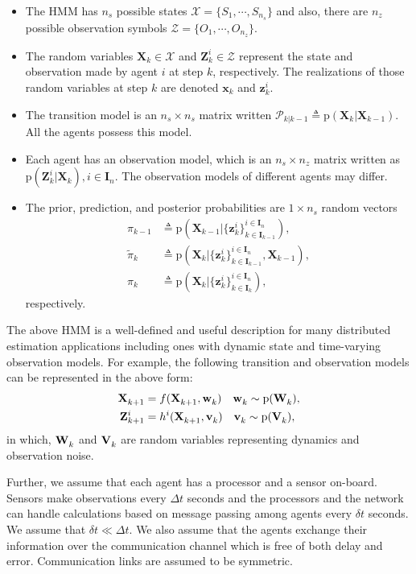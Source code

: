 \documentclass[journal]{IEEEtran}
\newcommand{\vect}[1]{{\mathbf{#1}}}
\theoremstyle{remark}
\newcommand{\pr}{\textrm{p}}
\newcommand{\XX}[3][2]{\mathbf{X}_{  #2}^{ #3}}
\newcommand{\bIn}{\boldsymbol{I}_{{n}}}
\newcommand{\bIk}{\boldsymbol{I}_{{k}}}
\newcommand{\bIkk}{\boldsymbol{I}_{{k-1}}}
\newcommand{\zz}[3][2]{\mathbf{z}_{ #2}^{ #3}}
\newcommand{\ZZ}[3][2]{\mathbf{Z}_{ #2}^{ #3}}
\theoremstyle{definition}
\begin{document}
\begin{itemize}
\item The HMM has $n_s$ possible states 
 \mbox{$\mathcal{X} = \{S_1,\cdots,S_{n_s}\}$} and also, there are $n_z$ possible observation symbols 
 \mbox{$\mathcal{Z} = \{O_1,\cdots,O_{n_z}\}$}.
\item The random variables $\vect{X}_k \in \mathcal{X}$ and $\vect{Z}_k^i \in
 \mathcal{Z}$ represent the state and observation made by agent $i$ at step $k$,
 respectively. The realizations of those random variables at step $k$ are
 denoted $\vect{x}_k$ and $\vect{z}_k^i$.    
\item The transition model is an $n_s\times n_s$ matrix written
 $\mathcal{P}_{k \vert k-1}\triangleq \pr(\vect{X}_{k} | \XX[]{k-1}{})$. All the
 agents possess this model.
\item Each agent has an observation model, which is an $n_s\times n_z$ 
 matrix written as $\pr(\vect{Z}_{k}^{i} | \vect{X}_{k}), i\in\bIn$. The 
 observation models of different agents may differ.
\item The prior, prediction, and posterior probabilities are $1\times n_s$ random vectors
 \begin{align}
 \pi_{k-1}&\triangleq \pr\left(\XX[]{k-1}{}|\{\zz{k}{i}\}^{i\in\bIn}_{k\in\bIkk}\right),\nonumber\\
 \tilde{\pi}_{k}&\triangleq \pr\left(\XX[]{k}{}|\{\zz{k}{i}\}^{i\in\bIn}_{k\in\bIkk},\XX[]{k-1}{}\right),\nonumber\\
 \pi_{k}&\triangleq \pr\left(\XX[]{k}{}|\{\zz{k}{i}\}^{i\in\bIn}_{k\in\bIk}\right),\nonumber
 \end{align}
 respectively.
\end{itemize}

The above HMM is a well-defined and useful description for many distributed
estimation applications including ones with dynamic state and time-varying
observation models. For example, the following transition and observation
models can be represented in the above form:
\begin{align}
\XX[]{k+1}{} &= f(\XX[]{k+1}{},\ais{\vect{w}}{k}{})\quad \ais{\vect{w}}{k}{} \sim \pr(\ais{\vect{W}}{k}{}), \\
\ZZ{k+1}{i} &= h^i(\XX[]{k+1}{},\ais{\vect{v}}{k}{})\quad \ais{\vect{v}}{k}{} \sim \pr(\ais{\vect{V}}{k}{}), 
\end{align}
in which, $\ais{\vect{W}}{k}{}$ and $\ais{\vect{V}}{k}{}$ are random variables
representing dynamics and observation noise. 

Further, we assume that each agent
has a processor and a sensor on-board. Sensors make observations every $\Delta
t$ seconds and the processors and the network can handle calculations based on
message passing among agents every $\delta t$ seconds. We assume that $\delta t
\ll \Delta t$. We also assume that the agents exchange their information over
the communication channel which is free of both delay and error. 
Communication links are assumed to be symmetric.
\end{document}
